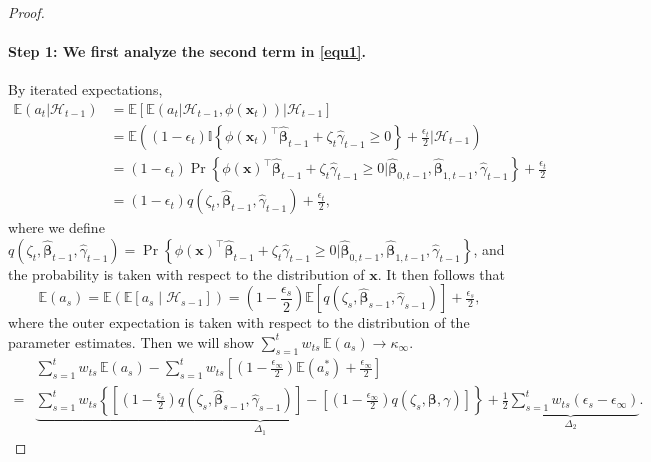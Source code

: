 \documentclass[12pt]{article}
\begin{document}
\begin{proof}
    \paragraph{Step 1: We first analyze the second term in \eqref{equ1}.} By iterated expectations,
    \begin{align*}
    \mathbb{E}(a_t \vert \mathcal{H}_{t-1}) &= \mathbb{E}[\mathbb{E}(a_t \vert \mathcal{H}_{t-1},\phi(\bm{x}_t))\vert \mathcal{H}_{t-1}] \\
    &=\mathbb{E} \left((1-\epsilon_t) \mathbb{I}\left\{\phi(\bm{x}_t)^{\top} \widehat{\bm{\beta}}_{t-1} + \zeta_t \widehat{\gamma}_{t-1} \geq 0 \right\} + \frac{\epsilon_t}{2} \Big| \mathcal{H}_{t-1} \right) \\
    &= (1-\epsilon_t) \Pr\left\{\phi(\bm{x})^{\top} \widehat{\bm{\beta}}_{t-1} + \zeta_t \widehat{\gamma}_{t-1} \geq 0 \Big| \widehat{\bm{\beta}}_{0,t-1}, \widehat{\bm{\beta}}_{1,t-1}, \widehat{\gamma}_{t-1} \right\} + \tfrac{\epsilon_t}{2} \\
    &= (1-\epsilon_t) q\!\left(\zeta_t,\widehat{\bm{\beta}}_{t-1},\widehat{\gamma}_{t-1}\right) + \tfrac{\epsilon_t}{2},
    \end{align*}
    where we define
$q\!\left(\zeta_t,\widehat{\bm{\beta}}_{t-1},\widehat{\gamma}_{t-1}\right) 
= \Pr\left\{\phi(\bm{x})^{\top} \widehat{\bm{\beta}}_{t-1} + \zeta_t \widehat{\gamma}_{t-1} \geq 0 \Big| \widehat{\bm{\beta}}_{0,t-1}, \widehat{\bm{\beta}}_{1,t-1}, \widehat{\gamma}_{t-1} \right\}$, and the probability is taken with respect to the distribution of $\bm{x}$.  
It then follows that
\[
\mathbb{E}(a_s) 
= \mathbb{E}\!\left(\mathbb{E}[a_s \mid \mathcal{H}_{s-1}]\right) 
= \left(1-\frac{\epsilon_s}{2}\right)\mathbb{E}\!\left[q\!\left(\zeta_s,\widehat{\bm{\beta}}_{s-1},\widehat{\gamma}_{s-1}\right)\right] + \tfrac{\epsilon_s}{2},
\]
where the outer expectation is taken with respect to the distribution of the parameter estimates. Then we will show $\sum_{s=1}^t w_{ts}\,\mathbb{E}(a_s) \to \kappa_\infty$.
\begin{align*}
    &\sum_{s=1}^t w_{ts}\,\mathbb{E}(a_s) - \sum_{s=1}^t w_{ts}\left[\left(1-\tfrac{\epsilon_\infty}{2} \right)\mathbb{E}(a_s^\ast)+\tfrac{\epsilon_\infty}{2}\right] \\
    = & \underbrace{\sum_{s=1}^t w_{ts}\left\{\left[\left(1-\tfrac{\epsilon_s}{2} \right)q\!\left(\zeta_s,\widehat{\bm{\beta}}_{s-1},\widehat{\gamma}_{s-1}\right) \right] - \left[ \left(1-\tfrac{\epsilon_\infty}{2} \right) q\!\left(\zeta_s,\bm{\beta},\gamma \right)\right]\right\}}_{\Delta_1} + \underbrace{\tfrac{1}{2}\sum_{s=1}^t w_{ts} (\epsilon_s - \epsilon_\infty)}_{\Delta_2}.

\end{align*}
\end{proof}
\end{document}
